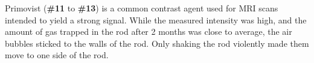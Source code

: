 Primovist (\textbf{\#11} to \textbf{\#13}) is a common contrast agent used for MRI scans \cite{VanBeers2012, Rohrer, primovist} intended to yield a strong signal.
While the measured intensity was high, and the amount of gas trapped in the rod after 2 months was close to average, the air bubbles sticked to the walls of the rod.
Only shaking the rod violently made them move to one side of the rod.


